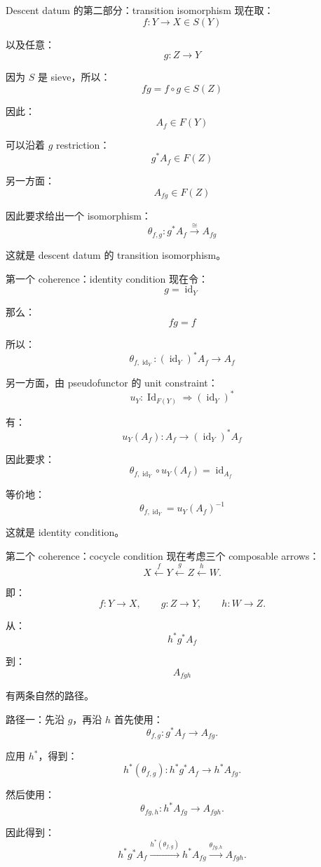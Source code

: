 \documentclass{beamer}
\begin{document}
\begin{frame}{Descent datum 的第二部分：transition isomorphism}
现在取：
$$
f:Y\to X\in S(Y)
$$

以及任意：
$$
g:Z\to Y
$$

因为 \(S\) 是 sieve，所以：
$$
fg=f\circ g\in S(Z)
$$

因此：
$$
A_f\in F(Y)
$$

可以沿着 \(g\) restriction：
$$
g^*A_f\in F(Z)
$$

另一方面：
$$
A_{fg}\in F(Z)
$$

因此要求给出一个 isomorphism：
$$
\boxed{
\theta_{f,g}:
g^*A_f
\xrightarrow{\cong}
A_{fg}
}
$$

这就是 descent datum 的 transition isomorphism。
\end{frame}

\begin{frame}{第一个 coherence：identity condition}
现在令：
$$
g=\operatorname{id}_Y
$$

那么：
$$
fg=f
$$

所以：
$$
\theta_{f,\operatorname{id}_Y}:
(\operatorname{id}_Y)^*A_f
\longrightarrow
A_f
$$

另一方面，由 pseudofunctor 的 unit constraint：
$$
u_Y:
\operatorname{Id}_{F(Y)}
\Rightarrow
(\operatorname{id}_Y)^*
$$

有：
$$
u_Y(A_f):
A_f
\longrightarrow
(\operatorname{id}_Y)^*A_f
$$

因此要求：
$$
\boxed{
\theta_{f,\operatorname{id}_Y}
\circ
u_Y(A_f)
=
\operatorname{id}_{A_f}
}
$$

等价地：
$$
\boxed{
\theta_{f,\operatorname{id}_Y}
=
u_Y(A_f)^{-1}
}
$$

这就是 identity condition。
\end{frame}

\begin{frame}[fragile]{第二个 coherence：cocycle condition}
现在考虑三个 composable arrows：
$$
\boxed{
X\xleftarrow{f}Y\xleftarrow{g}Z\xleftarrow{h}W.
}
$$

即：
$$
f:Y\to X,
\qquad
g:Z\to Y,
\qquad
h:W\to Z.
$$

从：
$$
h^*g^*A_f
$$

到：
$$
A_{fgh}
$$

有两条自然的路径。
\end{frame}

\begin{frame}[fragile]{路径一：先沿 \(g\)，再沿 \(h\)}
首先使用：
$$
\theta_{f,g}:
g^*A_f\to A_{fg}.
$$

应用 \(h^*\)，得到：
$$
h^*(\theta_{f,g}):
h^*g^*A_f
\longrightarrow
h^*A_{fg}.
$$

然后使用：
$$
\theta_{fg,h}:
h^*A_{fg}
\longrightarrow
A_{fgh}.
$$

因此得到：
$$
\boxed{
h^*g^*A_f
\xrightarrow{h^*(\theta_{f,g})}
h^*A_{fg}
\xrightarrow{\theta_{fg,h}}
A_{fgh}.
}
$$
\end{frame}
\end{document}
